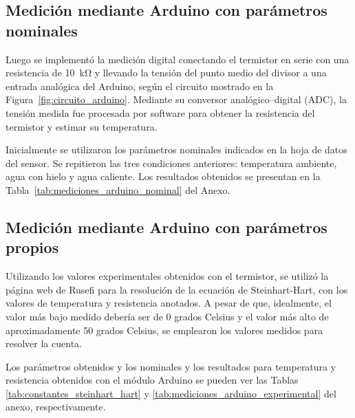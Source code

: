 \documentclass[10pt]{article}
\begin{document}
\subsection{Medición mediante Arduino con parámetros nominales}

Luego se implementó la medición digital conectando el termistor en serie con una
resistencia de \SI{10}{\kilo\ohm} y llevando la tensión del punto medio del divisor
a una entrada analógica del Arduino, según el circuito mostrado en la
Figura~\ref{fig:circuito_arduino}. Mediante su conversor analógico--digital (ADC),
la tensión medida fue procesada por software para obtener la resistencia del
termistor y estimar su temperatura.
\vspace{0.3cm}

Inicialmente se utilizaron los parámetros nominales indicados en la hoja de datos
del sensor. Se repitieron las tres condiciones anteriores: temperatura ambiente,
agua con hielo y agua caliente. Los resultados obtenidos se presentan en la
Tabla~\ref{tab:mediciones_arduino_nominal} del Anexo.

%
%
%

\subsection{Medición mediante Arduino con parámetros propios}
Utilizando los valores experimentales obtenidos con el termistor, se utilizó la página web de Rusefi para la resolución de la ecuación de Steinhart-Hart, con los valores de temperatura y resistencia anotados.
A pesar de que, idealmente, el valor más bajo medido debería ser de 0 grados Celsius y el valor más alto de aproximadamente 50 grados Celsius, se emplearon los valores medidos para resolver la cuenta.
\vspace{0.3cm}

Los parámetros obtenidos y los nominales y los resultados para temperatura y resistencia obtenidos con el módulo Arduino se pueden ver las Tablas \ref{tab:constantes_steinhart_hart} y \ref{tab:mediciones_arduino_experimental} del anexo, respectivamente.
\vspace{0.3cm}
\end{document}
